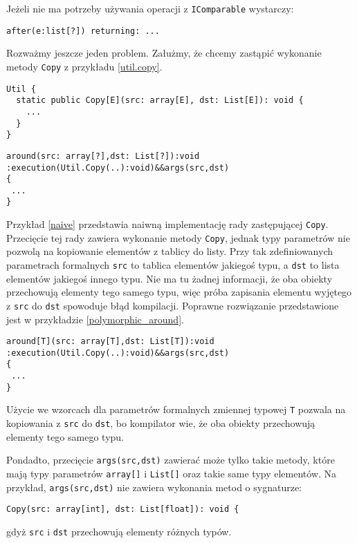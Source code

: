 \documentclass[a4paper,12pt]{mwbk}
\begin{document}
Jeżeli nie ma potrzeby używania operacji z \lstinline!IComparable! wystarczy:
\begin{lstlisting}[style=AspectJ]
after(e:list[?]) returning: ...
\end{lstlisting}

Rozważmy jeszcze jeden problem. Załużmy, że chcemy zastąpić wykonanie
metody \lstinline!Copy! z przykładu \ref{util.copy}.

\begin{lstlisting}[style=AspectJ,caption=Polimorficzna metoda,label=util.copy]
Util {
  static public Copy[E](src: array[E], dst: List[E]): void {
    ...
  }
}
\end{lstlisting}

\begin{lstlisting}[style=AspectJ,caption=Naiwna implementacja,label=naive]
around(src: array[?],dst: List[?]):void
:execution(Util.Copy(..):void)&&args(src,dst)
{
 ... 
}
\end{lstlisting}

Przykład \ref{naive} przedstawia naiwną implementację rady zastępującej \lstinline!Copy!.
Przecięcie tej rady zawiera wykonanie metody \lstinline!Copy!, jednak typy
parametrów nie pozwolą na kopiowanie elementów z tablicy do listy. Przy tak
zdefiniowanych parametrach formalnych \lstinline!src! to tablica elementów
jakiegoś typu, a \lstinline!dst! to lista elementów jakiegoś innego typu. Nie
ma tu żadnej informacji, że oba obiekty przechowują elementy tego samego typu,
więc próba zapisania elementu wyjętego z \lstinline!src! do \lstinline!dst!
spowoduje błąd kompilacji. Poprawne rozwiązanie przedstawione jest w przykładzie
\ref{polymorphic_around}.

\begin{lstlisting}[style=AspectJ,caption=Rada z parametrami typowymi,label=polymorphic_around]
around[T](src: array[T],dst: List[T]):void
:execution(Util.Copy(..):void)&&args(src,dst)
{
 ... 
}
\end{lstlisting}

Użycie we wzorcach dla parametrów formalnych zmiennej typowej \lstinline!T! pozwala
na kopiowania z \lstinline!src! do \lstinline!dst!, bo kompilator wie, że oba obiekty przechowują elementy
tego samego typu. 

Pondadto, przecięcie \lstinline!args(src,dst)! zawierać może tylko
takie metody, które mają typy parametrów \lstinline!array[]! i \lstinline!List[]! oraz takie same typy elementów.
Na przykład, \lstinline!args(src,dst)! nie zawiera wykonania metod o sygnaturze:
\begin{lstlisting}[style=AspectJ]
Copy(src: array[int], dst: List[float]): void {
\end{lstlisting}
gdyż \lstinline!src! i \lstinline!dst! przechowują elementy różnych typów.
\end{document}
